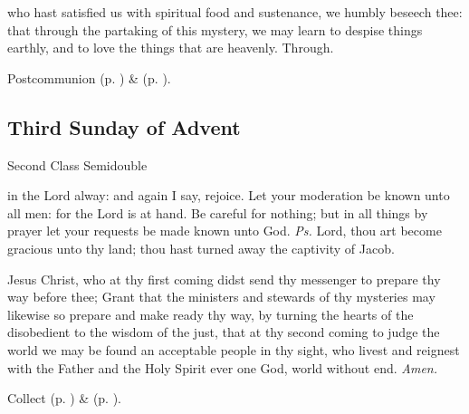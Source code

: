 \vspace{-0.1\baselineskip}

 who hast satisfied us with spiritual food and sustenance, we humbly beseech thee: that through the partaking of this mystery, we may learn to despise things earthly, and to love the things that are heavenly. Through.

\begin{rubric}
     Postcommunion  (p. \pageref{AdventIPostcommunion}) \&   (p. \pageref{SPMaryInAdvent}).
\end{rubric}


\subsection{Third Sunday of Advent}
\begin{inhead}
{Second Class Semidouble}
\end{inhead}


\vspace{-0.25\baselineskip}

\introit
{} in the Lord alway: and again I say, rejoice. Let your moderation be known unto all men: for the Lord is at hand. Be careful for nothing; but in all things by prayer let your requests be made known unto God. \textit{Ps.} Lord, thou art become gracious unto thy land; thou hast turned away the captivity of Jacob.

\vspace{-0.25\baselineskip}

\collect

\vspace{-0.1\baselineskip}

 Jesus Christ, who at thy first coming didst send thy messenger to prepare thy way before thee; Grant that the ministers and stewards of thy mysteries may likewise so prepare and make ready thy way, by turning the hearts of the disobedient to the wisdom of the just, that at thy second coming to judge the world we may be found an acceptable people in thy sight, who livest and reignest with the Father and the Holy Spirit ever one God, world without end. \textit{Amen.}

\begin{rubric}
     Collect  (p. \pageref{AdventICollect}) \&   (p. \pageref{SPMaryInAdvent}).
\end{rubric}

